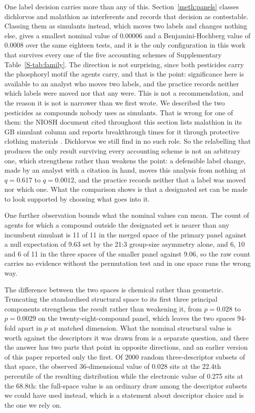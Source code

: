 \documentclass[1p,times]{elsarticle}
\begin{document}
One label decision carries more than any of this. Section~\ref{meth:panels}
classes dichlorvos and malathion as interferents and records that decision as
contestable. Classing them as simulants instead, which moves two labels and
changes nothing else, gives a smallest nominal value of 0.00006 and a
Benjamini-Hochberg value of 0.0008 over the same eighteen tests, and it is the
only configuration in this work that survives every one of the five accounting
schemes of Supplementary Table~\ref{S-tab:family}. The direction is
not surprising, since both pesticides carry the phosphoryl motif the agents
carry, and that is the point: significance here is available to an analyst who
moves two labels, and the practice records neither which labels were moved nor
that any were. This is not a recommendation, and the reason it is not is
narrower than we first wrote. We described the two pesticides as compounds
nobody uses as simulants. That is wrong for one of them: the NIOSH document
cited throughout this section lists malathion in its GB simulant column and
reports breakthrough times for it through protective clothing materials
\cite{niosh2002simulant}. Dichlorvos we still find in no such role. So the
relabelling that produces the only result surviving every accounting scheme is
not an arbitrary one, which strengthens rather than weakens the point: a
defensible label change, made by an analyst with a citation in hand, moves this
analysis from nothing at $q=0.617$ to $q=0.0012$, and the practice records
neither that a label was moved nor which one. What the comparison shows is that
a designated set can be made to look supported by choosing what goes into it.

One further observation bounds what the nominal values can mean. The count of
agents for which a compound outside the designated set is nearer than any
incumbent simulant is 11 of 11 in the merged space of the primary panel against
a null expectation of 9.63 set by the 21:3 group-size asymmetry alone, and 6, 10
and 6 of 11 in the three spaces of the smaller panel against 9.06, so the raw
count carries no evidence without the permutation test and in one space runs the
wrong way.

The difference between the two spaces is chemical rather than geometric.
Truncating the standardised structural space to its first three principal
components strengthens the result rather than weakening it, from $p=0.028$ to
$p=0.0029$ on the twenty-eight-compound panel, which leaves the two spaces
94-fold apart in $p$ at matched dimension. What the nominal structural value is
worth against the descriptors it was drawn from is a separate question, and
there the answer has two parts that point in opposite directions, and an earlier
version of this paper reported only the first. Of 2000 random three-descriptor
subsets of that space, the observed 36-dimensional value of 0.028 sits at the
22.4th percentile of the resulting distribution while the electronic value of
0.275 sits at the 68.8th: the full-space value is an ordinary draw among the
descriptor subsets we could have used instead, which is a statement about
descriptor choice and is the one we rely on.
\end{document}
